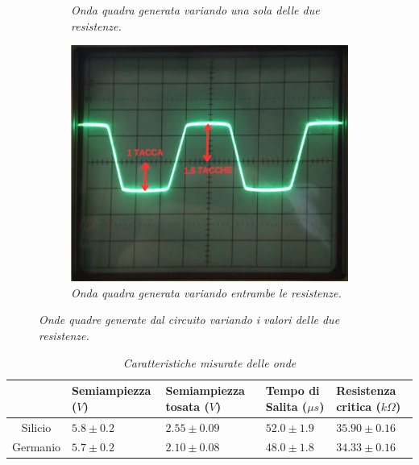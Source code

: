 \begin{figure}[H]
\begin{subfigure}{0.3\textwidth}
        \caption{\emph{Onda quadra generata variando una sola delle due resistenze.}}
        \label{fig : resistenze diverse 1}
      \end{subfigure}
      \hfill
      \begin{subfigure}{0.3\textwidth}
        \centering
        \includegraphics[width=\textwidth]{../assets/Resistenze_Diverse2.png}
        \caption{\emph{Onda quadra generata variando entrambe le resistenze.}}
        \label{fig : resistenze diverse 2}
      \end{subfigure}
      \caption{\emph{Onde quadre generate dal circuito variando i valori delle due resistenze.}}
    \label{fig:dati-raccolti}
  \end{figure}
\begin{table}[H]
  \centering
  \begin{tabular}[t]{c | p{3cm}  p{3cm}  p{3cm}  p{3cm}}
    \hline
    & Semiampiezza ($V$) & Semiampiezza tosata ($V$) & Tempo di Salita ($\mu s$) & Resistenza critica ($k \Omega$) \\
    \hline
    Silicio & $5.8 \pm 0.2$ & $2.55 \pm 0.09$ & $52.0 \pm 1.9$ & $35.90 \pm 0.16$ \\
    Germanio & $5.7 \pm 0.2$ & $2.10 \pm 0.08$ & $48.0 \pm 1.8$ & $34.33 \pm 0.16$ \\
    \hline
  \end{tabular}
  \caption{\emph{Caratteristiche misurate delle onde}}
  \label{tab : risultati}
\end{table}
